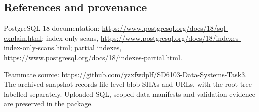 \subsection{References and provenance}
PostgreSQL 18 documentation: \url{https://www.postgresql.org/docs/18/sql-explain.html}; index-only scans, \url{https://www.postgresql.org/docs/18/indexes-index-only-scans.html}; partial indexes, \url{https://www.postgresql.org/docs/18/indexes-partial.html}.

Teammate source: \url{https://github.com/yzxfwdplf/SD6103-Data-Systems-Task3}. The archived snapshot records file-level blob SHAs and URLs, with the root tree labelled separately. Uploaded SQL, scoped-data manifests and validation evidence are preserved in the package.

